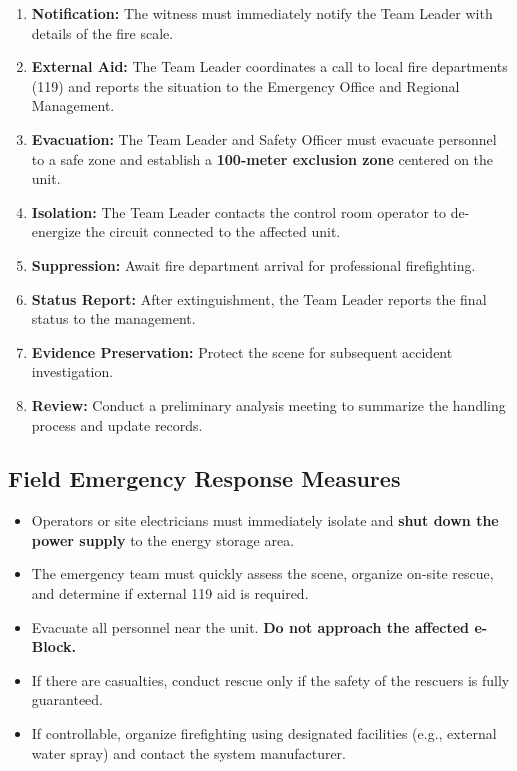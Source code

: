 \documentclass[11pt, a4paper]{article}
\begin{document}
\begin{enumerate}[label=\arabic*., leftmargin=2em]
    \item \textbf{Notification:} The witness must immediately notify the Team Leader with details of the fire scale.
    \item \textbf{External Aid:} The Team Leader coordinates a call to local fire departments (119) and reports the situation to the Emergency Office and Regional Management.
    \item \textbf{Evacuation:} The Team Leader and Safety Officer must evacuate personnel to a safe zone and establish a \textbf{100-meter exclusion zone} centered on the unit.
    \item \textbf{Isolation:} The Team Leader contacts the control room operator to de-energize the circuit connected to the affected unit.
    \item \textbf{Suppression:} Await fire department arrival for professional firefighting.
    \item \textbf{Status Report:} After extinguishment, the Team Leader reports the final status to the management.
    \item \textbf{Evidence Preservation:} Protect the scene for subsequent accident investigation.
    \item \textbf{Review:} Conduct a preliminary analysis meeting to summarize the handling process and update records.
\end{enumerate}

\subsection*{Field Emergency Response Measures}
\begin{itemize}[label=\checkmark]
    \item Operators or site electricians must immediately isolate and \textbf{shut down the power supply} to the energy storage area.
    \item The emergency team must quickly assess the scene, organize on-site rescue, and determine if external 119 aid is required.
    \item Evacuate all personnel near the unit. \textbf{Do not approach the affected e-Block.}
    \item If there are casualties, conduct rescue only if the safety of the rescuers is fully guaranteed.
    \item If controllable, organize firefighting using designated facilities (e.g., external water spray) and contact the system manufacturer.
\end{itemize}
\end{document}
